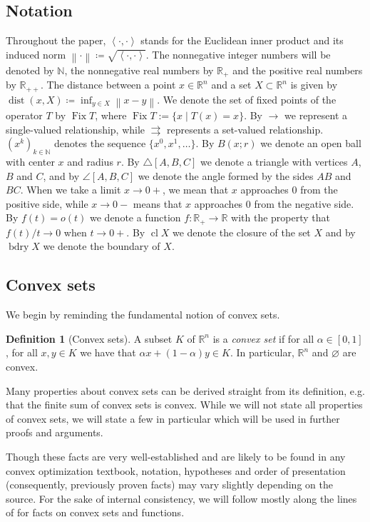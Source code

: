 \documentclass[smallextended,numbook,nospthms]{svjour3}
\theoremstyle{plain}
\theoremstyle{definition}
\newtheorem{definition}[theorem]{Definition}
\def\RR{\mathds R}
\def\NN{\mathds N}
\DeclareMathOperator{\Fix}{Fix}
\DeclareMathOperator{\dist}{dist}
\newcommand{\norm}[1]{\left\lVert#1\right\rVert}
\newcommand{\scal}[2]{\left\langle{#1},{#2}  \right\rangle}
\begin{document}
\subsection{Notation}
Throughout the paper, $\scal{\cdot}{\cdot}$ stands for the Euclidean inner product and its induced  norm $\norm{\cdot}\coloneqq\sqrt{\scal{\cdot}{\cdot}}$. The nonnegative integer numbers will be denoted by $\NN$, the nonnegative real numbers by $\RR_{+}$ and the positive real numbers by $\RR_{++}$. The distance between a point $x\in\RR^{n}$ and a set $X\subset \RR^{n}$ is given by $\dist(x,X)\coloneqq \inf_{y\in X} \norm{x-y}$. We denote the set of fixed points of the operator $T$ by $\Fix T$, where $\Fix T := \{x \mid T(x)=x\}$. By $\rightarrow$ we represent a single-valued relationship, while $\rightrightarrows$ represents a set-valued relationship. $(x^k)_{k \in \NN}$ denotes the sequence $\{x^0, x^1, \ldots\}$. By $B(x;r)$ we denote an open ball with center $x$ and radius $r$. By $\triangle{[A, B, C]}$ we denote a triangle with vertices $A$, $B$ and $C$, and by $\angle{[A, B, C]}$ we denote the angle formed by the sides $AB$ and $BC$. When we take a limit $x \rightarrow 0+$, we mean that $x$ approaches 0 from the positive side, while $x \rightarrow 0-$ means that $x$ approaches 0 from the negative side. By $f(t)=o(t)$ we denote a function $f:\RR_{+} \rightarrow \RR$ with the property that $f(t)/t \rightarrow 0$ when $t \rightarrow 0+$. By $\operatorname{cl} X$ we denote the closure of the set $X$ and by $\operatorname{bdry} X$ we denote the boundary of $X$.

\subsection{Convex sets}
We begin by reminding the fundamental notion of convex sets.
\begin{definition}[Convex sets]\label{def:convex}
	A subset $K$ of $\RR^n$ is a \emph{convex set} if for all $\alpha \in [0,1]$, for all $x,y \in K$ we have that $\alpha x + (1-\alpha)y \in K$. In particular, $\RR^n$ and $\varnothing$ are convex.
	\end{definition}

Many properties about convex sets can be derived straight from its definition, e.g. that the finite sum of convex sets is convex. While we will not state all properties of convex sets, we will state a few in particular which will be used in further proofs and arguments.

Though these facts are very well-established and are likely to be found in any convex optimization textbook, notation, hypotheses and order of presentation (consequently, previously proven facts) may vary slightly depending on the source. For the sake of internal consistency, we will follow mostly along the lines of \cite{Izmailov:2014} for facts on convex sets and functions.
\end{document}
